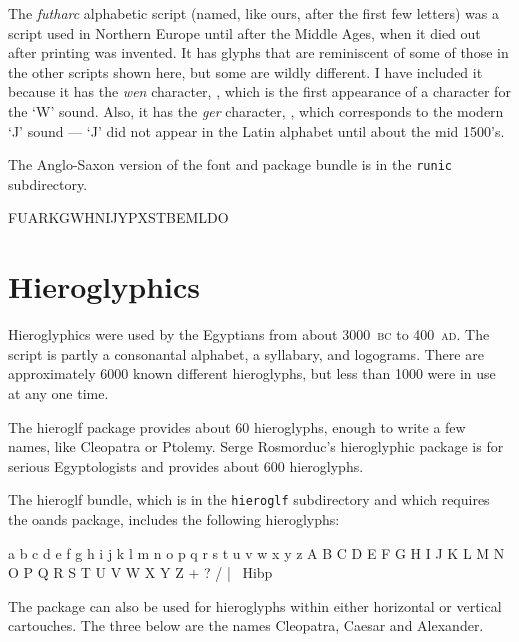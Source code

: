 \documentclass{article}
\newcommand{\BC}{\textsc{bc}}
\newcommand{\AD}{\textsc{ad}}
\begin{document}
    The \textit{futharc} alphabetic script 
(named, like ours, after the first few letters)
was a script used in Northern Europe until after the Middle Ages, when it
died out after printing was invented. It has glyphs that are reminiscent of
some of those in the other scripts shown here, but some are wildly different.
I have included it because it has the \textit{wen} character, ,
which is the first appearance of a character for the `W' sound. Also, it
has the \textit{ger} character, , which corresponds to the modern
`J' sound --- `J' did not appear in the Latin alphabet until about the mid
1500's.

    The Anglo-Saxon version of the font and package bundle is in the \texttt{runic} 
subdirectory.

\begin{center}
\futfamily
FU\Fthorn ARKGWHNIJYPXSTBEML\Fng DO
\end{center}

\section{Hieroglyphics}

    Hieroglyphics were used by the Egyptians from about 3000~\BC{} to
400~\AD. The script is partly a consonantal alphabet, a syllabary,
and logograms. There are approximately 6000 known different
hieroglyphs, but less than 1000 were in use at any one time.

    The hieroglf package provides about 60 hieroglyphs, enough to
write a few names, like Cleopatra or Ptolemy. Serge Rosmorduc's
hieroglyphic package is for serious Egyptologists and provides about
600 hieroglyphs.

    The hieroglf bundle, which is in the \texttt{hieroglf} subdirectory and
which requires the oands package, includes the following hieroglyphs:

\begin{center}
\renewcommand{\baselinestretch}{1.2}
\pmhgfamily
a b c d e f g h i j k l m n o p q r s t u v w x y z
A B C D E F G H I J K L M N O P Q R S T U V W X Y Z
+ ? / | \Hms\ Hibp\ \Hibw\ \Hibs\ \Hibl\ \Hsv
\end{center}

    The package can also be used for hieroglyphs within either
horizontal or vertical cartouches. The three below are the
names Cleopatra, Caesar and Alexander.

\begin{center}
\renewcommand{\baselinestretch}{1.2}
\end{center}
\end{document}
